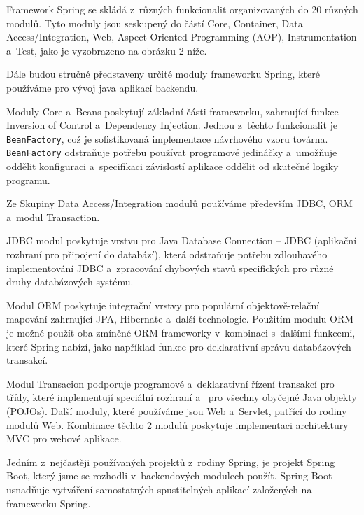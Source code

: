 \documentclass[12pt]{article}
\begin{document}
{Framework Spring se skládá z~různých funkcionalit organizovaných do 20 různých modulů.
Tyto moduly jsou seskupený do částí Core, Container, Data Access/Integration,
Web, Aspect Oriented Programming (AOP), Instrumentation a~Test,
jako je vyzobrazeno na obrázku 2 níže.

\cite{springFrameworkDocs}

\obrazek
{}

Dále budou stručně představeny určité moduly frameworku Spring,
které používáme pro vývoj java aplikací backendu.

Moduly Core a~Beans poskytují základní části frameworku,
zahrnující funkce Inversion of Control a~Dependency Injection.
Jednou z~těchto funkcionalit je \texttt{BeanFactory},
což je sofistikovaná implementace návrhového vzoru továrna.
\texttt{BeanFactory} odstraňuje potřebu používat programové jedináčky
a~umožňuje oddělit konfiguraci a~specifikaci závislostí aplikace oddělit od skutečné logiky programu.


Ze Skupiny Data Access/Integration modulů používáme především JDBC, ORM
a~modul Transaction.

JDBC modul poskytuje vrstvu pro Java Database Connection
-- JDBC (aplikační rozhraní pro připojení do databází), 
která odstraňuje potřebu zdlouhavého implementování JDBC a~zpracování chybových stavů specifických pro různé druhy databázových systému.

Modul ORM poskytuje integrační vrstvy pro populární objektově-relační mapování
zahrnující JPA, Hibernate a~další technologie.
Použitím modulu ORM je možné použít oba zmíněné ORM frameworky 
v~kombinaci s~dalšími funkcemi, které Spring nabízí, 
jako například funkce pro deklarativní správu databázových transakcí.

Modul Transacion podporuje programové a~deklarativní řízení
transakcí pro třídy, které implementují speciální rozhraní a~
pro všechny obyčejné Java objekty (POJOs).
Další moduly, které používáme jsou Web a~Servlet, patřící do rodiny modulů Web.
Kombinace těchto 2 modulů poskytuje implementaci architektury MVC
pro webové aplikace.

\cite{springFrameworkDocs}

Jedním z~nejčastěji používaných projektů z~rodiny Spring,
je projekt Spring Boot, který jsme se rozhodli v~backendových modulech použít.
Spring-Boot usnadňuje vytváření samostatných spustitelných aplikací
založených na frameworku Spring.

}
\end{document}

